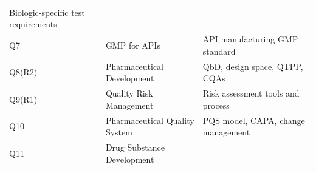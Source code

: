 \documentclass[
  11pt,
  a4paper,
]{report}
\begin{document}
\begin{longtable}[]{@{}lll@{}}
\begin{minipage}[t]{0.41\columnwidth}
Biologic-specific test requirements\strut
\end{minipage}\tabularnewline
\begin{minipage}[t]{0.30\columnwidth}\raggedright
Q7\strut
\end{minipage} & \begin{minipage}[t]{0.19\columnwidth}\raggedright
GMP for APIs\strut
\end{minipage} & \begin{minipage}[t]{0.41\columnwidth}\raggedright
API manufacturing GMP standard\strut
\end{minipage}\tabularnewline
\begin{minipage}[t]{0.30\columnwidth}\raggedright
Q8(R2)\strut
\end{minipage} & \begin{minipage}[t]{0.19\columnwidth}\raggedright
Pharmaceutical Development\strut
\end{minipage} & \begin{minipage}[t]{0.41\columnwidth}\raggedright
QbD, design space, QTPP, CQAs\strut
\end{minipage}\tabularnewline
\begin{minipage}[t]{0.30\columnwidth}\raggedright
Q9(R1)\strut
\end{minipage} & \begin{minipage}[t]{0.19\columnwidth}\raggedright
Quality Risk Management\strut
\end{minipage} & \begin{minipage}[t]{0.41\columnwidth}\raggedright
Risk assessment tools and process\strut
\end{minipage}\tabularnewline
\begin{minipage}[t]{0.30\columnwidth}\raggedright
Q10\strut
\end{minipage} & \begin{minipage}[t]{0.19\columnwidth}\raggedright
Pharmaceutical Quality System\strut
\end{minipage} & \begin{minipage}[t]{0.41\columnwidth}\raggedright
PQS model, CAPA, change management\strut
\end{minipage}\tabularnewline
\begin{minipage}[t]{0.30\columnwidth}\raggedright
Q11\strut
\end{minipage} & \begin{minipage}[t]{0.19\columnwidth}\raggedright
Drug Substance Development\strut
\end{minipage} & \begin{minipage}[t]{0.41\columnwidth}\raggedright

\end{minipage}
\end{longtable}
\end{document}
